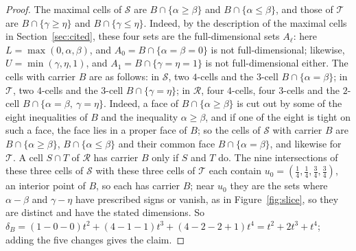 \documentclass[11pt]{article}
\theoremstyle{definition}
\theoremstyle{remark}
\newcommand{\SSS}{\mathcal S}
\newcommand{\TT}{\mathcal T}
\newcommand{\RR}{\mathcal R}
\begin{document}
\begin{proof}
The maximal cells of $\SSS$ are $B\cap\{\alpha\geq\beta\}$ and
$B\cap\{\alpha\leq\beta\}$, and those of $\TT$ are $B\cap\{\gamma\geq\eta\}$ and $B\cap\{\gamma\leq\eta\}$. Indeed, by the description of the maximal cells in Section~\ref{sec:cited}, these four sets are the full-dimensional sets $A_\ell$: here $L=\max(0,\alpha,\beta)$, and
$A_0=B\cap\{\alpha=\beta=0\}$ is not full-dimensional; likewise, $U=\min(\gamma,\eta,1)$, and $A_1=B\cap\{\gamma=\eta=1\}$ is not full-dimensional either. The cells with carrier $B$ are as follows: in $\SSS$, two $4$-cells and the $3$-cell $B\cap\{\alpha=\beta\}$; in $\TT$, two
$4$-cells and the $3$-cell $B\cap\{\gamma=\eta\}$; in $\RR$, four
$4$-cells, four $3$-cells and the $2$-cell
$B\cap\{\alpha=\beta,\ \gamma=\eta\}$. Indeed, a face of $B\cap\{\alpha\geq\beta\}$ is cut out by some of the eight inequalities of $B$ and the inequality $\alpha\geq\beta$,
and if one of the eight is tight on such a face, the face lies in a proper face of $B$; so the cells of $\SSS$ with carrier
$B$ are $B\cap\{\alpha\geq\beta\}$, $B\cap\{\alpha\leq\beta\}$ and their common face $B\cap\{\alpha=\beta\}$, and
likewise for $\TT$. A cell $S\cap T$ of $\RR$ has carrier $B$ only if $S$ and $T$ do. The nine intersections of
these three cells of $\SSS$ with these three cells of $\TT$ each contain $u_0=(\frac14,\frac14,\frac34,\frac34)$,
an interior point of $B$, so each has carrier $B$; near $u_0$ they are the sets where $\alpha-\beta$ and
$\gamma-\eta$ have prescribed signs or vanish, as in Figure~\ref{fig:slice}, so they are distinct and have the
stated dimensions. So
$\delta_B=(1-0-0)t^2+(4-1-1)t^3+(4-2-2+1)t^4=t^2+2t^3+t^4$; adding the
five changes gives the claim.
\end{proof}
\end{document}
